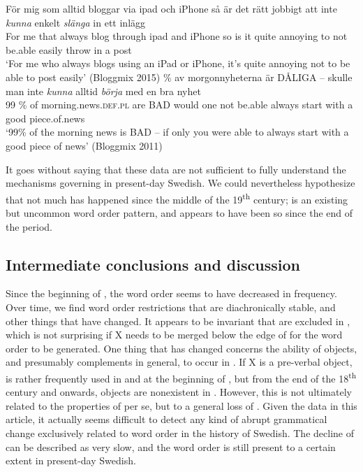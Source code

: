 \documentclass[output=paper, colorlinks, citecolor=brown]{langscibook}
\begin{document}
\ea {}\label{ex:sangfelt:27}
\ea\label{ex:sangfelt:27a}
\gll För mig som alltid bloggar via ipad och iPhone så är det rätt jobbigt att inte \textit{kunna} {enkelt} \textit{slänga} in ett inlägg\\
 For me that always blog through ipad and iPhone so is it quite annoying to not be.able easily throw in a post\\
\glt ‘For me who always blogs using an iPad or iPhone, it’s quite annoying not to be able to post easily’ (Bloggmix 2015)
\ex \label{ex:sangfelt:27b} \% av morgonnyheterna är DÅLIGA – skulle man inte \textit{kunna} {alltid} \textit{börja} med en bra nyhet \\
                                99 \% of morning.news.\textsc{def.pl} are BAD {} would one not be.able always start with a good piece.of.news \\
\glt ‘99\% of the morning news is BAD – if only you were able to always start with a good piece of news’ (Bloggmix 2011)\\
\z 
\z 

It goes without saying that these data are not sufficient to fully understand the mechanisms governing  in present-day Swedish. We could nevertheless hypothesize that not much has happened since the middle of the 19\textsuperscript{th} century;  is an existing but uncommon word order pattern, and appears to have been so since the end of the  period.

\subsection{Intermediate conclusions and discussion}\label{sec:sangfelt:4.4}
Since the beginning of , the  word order seems to have decreased in frequency. Over time, we find word order restrictions that are diachronically stable, and other things that have changed. It appears to be invariant that  are excluded in , which is not surprising if X needs to be merged below the edge of  for the word order to be generated. One thing that has changed concerns the ability of objects, and presumably complements in general, to occur in . If X is a pre-verbal object,  is rather frequently used in  and at the beginning of , but from the end of the 18\textsuperscript{th} century and onwards, objects are nonexistent in . However, this is not ultimately related to the properties of  per se, but to a general loss of . Given the data in this article, it actually seems difficult to detect any kind of abrupt grammatical change exclusively related to  word order in the history of Swedish. The decline of  can be described as very slow, and the word order is still present to a certain extent in present-day Swedish.
\end{document}
